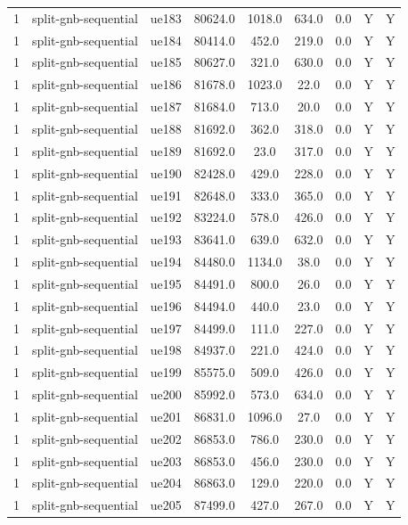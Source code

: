 \begin{table}[ht]
\begin{tabular}{|c|c|c|c|c|c|c|c|c|}
1 & split-gnb-sequential & ue183 & 80624.0 & 1018.0 & 634.0 & 0.0 & Y & Y \\
1 & split-gnb-sequential & ue184 & 80414.0 & 452.0 & 219.0 & 0.0 & Y & Y \\
1 & split-gnb-sequential & ue185 & 80627.0 & 321.0 & 630.0 & 0.0 & Y & Y \\
1 & split-gnb-sequential & ue186 & 81678.0 & 1023.0 & 22.0 & 0.0 & Y & Y \\
1 & split-gnb-sequential & ue187 & 81684.0 & 713.0 & 20.0 & 0.0 & Y & Y \\
1 & split-gnb-sequential & ue188 & 81692.0 & 362.0 & 318.0 & 0.0 & Y & Y \\
1 & split-gnb-sequential & ue189 & 81692.0 & 23.0 & 317.0 & 0.0 & Y & Y \\
1 & split-gnb-sequential & ue190 & 82428.0 & 429.0 & 228.0 & 0.0 & Y & Y \\
1 & split-gnb-sequential & ue191 & 82648.0 & 333.0 & 365.0 & 0.0 & Y & Y \\
1 & split-gnb-sequential & ue192 & 83224.0 & 578.0 & 426.0 & 0.0 & Y & Y \\
1 & split-gnb-sequential & ue193 & 83641.0 & 639.0 & 632.0 & 0.0 & Y & Y \\
1 & split-gnb-sequential & ue194 & 84480.0 & 1134.0 & 38.0 & 0.0 & Y & Y \\
1 & split-gnb-sequential & ue195 & 84491.0 & 800.0 & 26.0 & 0.0 & Y & Y \\
1 & split-gnb-sequential & ue196 & 84494.0 & 440.0 & 23.0 & 0.0 & Y & Y \\
1 & split-gnb-sequential & ue197 & 84499.0 & 111.0 & 227.0 & 0.0 & Y & Y \\
1 & split-gnb-sequential & ue198 & 84937.0 & 221.0 & 424.0 & 0.0 & Y & Y \\
1 & split-gnb-sequential & ue199 & 85575.0 & 509.0 & 426.0 & 0.0 & Y & Y \\
1 & split-gnb-sequential & ue200 & 85992.0 & 573.0 & 634.0 & 0.0 & Y & Y \\
1 & split-gnb-sequential & ue201 & 86831.0 & 1096.0 & 27.0 & 0.0 & Y & Y \\
1 & split-gnb-sequential & ue202 & 86853.0 & 786.0 & 230.0 & 0.0 & Y & Y \\
1 & split-gnb-sequential & ue203 & 86853.0 & 456.0 & 230.0 & 0.0 & Y & Y \\
1 & split-gnb-sequential & ue204 & 86863.0 & 129.0 & 220.0 & 0.0 & Y & Y \\
1 & split-gnb-sequential & ue205 & 87499.0 & 427.0 & 267.0 & 0.0 & Y & Y \\

\end{tabular}
\end{table}
